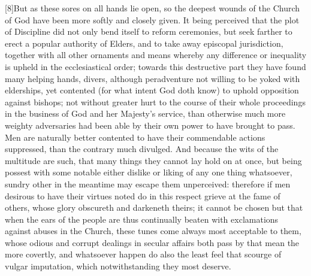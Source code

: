 [8]But as these sores on all hands lie open, so the deepest wounds of the Church of God have been more softly and closely given. It being perceived that the plot of Discipline did not only bend itself to reform ceremonies, but seek farther to erect a popular authority of Elders, and to take away episcopal jurisdiction, together with all other ornaments and means whereby any difference or inequality is upheld in the ecclesiastical order; towards this destructive part they have found many helping hands, divers, although peradventure not willing to be yoked with elderships, yet contented (for what intent God doth know) to uphold opposition against bishops; not without greater hurt to the course of their whole proceedings in the business of God and her Majesty’s service, than otherwise much more weighty adversaries had been able by their own power to have brought to pass. Men are naturally better contented to have their commendable actions suppressed, than the contrary much divulged. And because the wits of the multitude are such, that many things they cannot lay hold on at once, but being possest with some notable either dislike or liking of any one thing whatsoever, sundry other in the meantime may escape them unperceived: therefore if men desirous to have their virtues noted do in this respect grieve at the fame of others, whose glory obscureth and darkeneth theirs; it cannot be chosen but that when the ears of the people are thus continually beaten with exclamations against abuses in the Church, these tunes come always most acceptable to them, whose odious and corrupt dealings in secular affairs both pass by that mean the more covertly, and whatsoever happen do also the least feel that scourge of vulgar imputation, which notwithstanding they most deserve.

